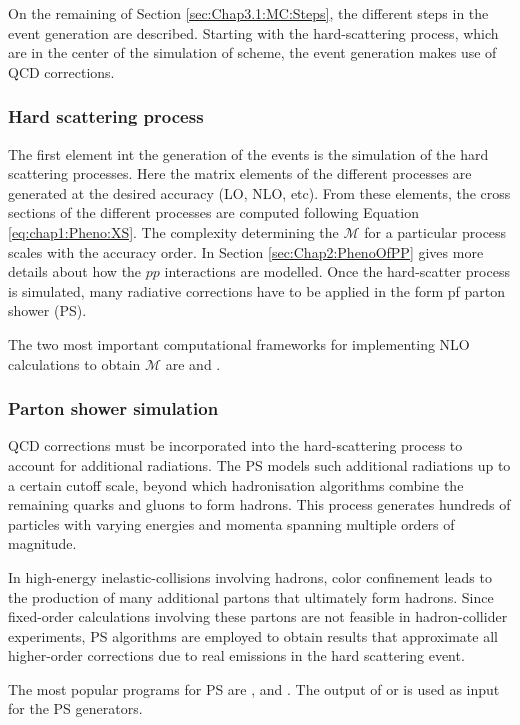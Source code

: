 On the remaining of Section \ref{sec:Chap3.1:MC:Steps}, 
the different steps in the event generation are described. 
Starting with the hard-scattering process, which are in
the center of the simulation of scheme, the event generation
makes use of QCD corrections.

\subsubsection{Hard scattering process}
\label{sec:Chap3.1:MC:Steps:HardScattering}
The first element int the generation of the events is the simulation of the hard scattering 
processes.
Here the matrix elements of the different processes are generated at the desired accuracy 
(LO, NLO, etc). From these elements, the cross sections of the different processes are 
computed following Equation \ref{eq:chap1:Pheno:XS}. The complexity determining the 
$\mathcal{M}$ for a particular process scales with the accuracy order. 
In Section \ref{sec:Chap2:PhenoOfPP} gives more details about how the \(pp\) interactions
are modelled.
Once the hard-scatter process is simulated, many radiative corrections have to be 
applied in the form pf parton shower (PS). 

The two most important computational frameworks for implementing NLO calculations 
to obtain $\mathcal{M}$ are \MGNLO \cite{NNPDF:2014otw} 
and \POWHEGBOX \cite{Frixione:2007vw}.
		
		
\subsubsection{Parton shower simulation}
QCD corrections must be incorporated into the hard-scattering process to account 
for additional radiations. The PS models such additional radiations up to a certain 
cutoff scale, beyond which hadronisation algorithms combine the remaining quarks 
and gluons to form hadrons. This process generates hundreds of particles with 
varying energies and momenta spanning multiple orders of magnitude.

In high-energy inelastic-collisions involving hadrons, color confinement leads to the 
production of many additional partons that ultimately form hadrons. Since fixed-order 
calculations involving these partons are not feasible in hadron-collider experiments, 
PS algorithms are employed to obtain results that approximate all higher-order corrections 
due to real emissions in the hard scattering event. 


The most popular programs for PS are \Herwig \cite{Bahr:2008pv}, 
\Pythia \cite{Sjostrand:2014zea} and \Sherpa \cite{Gleisberg:2008ta}. 
The output of \MGNLO or \POWHEGBOX is used as input for the PS
generators.


